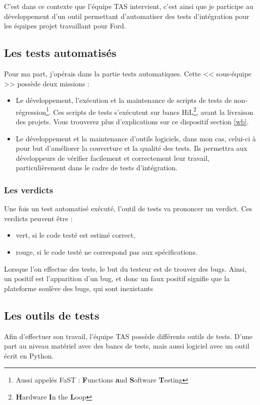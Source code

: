 C'est dans ce contexte que l'équipe TAS intervient, c'est ainsi que je participe au développement d'un outil permettant d'automatiser des tests d'intégration pour les équipes projet travaillant pour Ford.
\subsection{Les tests automatisés}

Pour ma part, j'opérais dans la partie tests automatiques. Cette << sous-équipe >> possède deux missions : 
\begin{itemize}
	\item Le développement, l'exécution et la maintenance de scripts de tests de non-régression\footnote{Aussi appelés FaST : \textbf{F}unctions \textbf{a}nd \textbf{S}oftware \textbf{T}esting}. Ces scripts de tests s'exécutent sur bancs HiL\footnote{\textbf{H}ardware \textbf{I}n the \textbf{L}oop}, avant la livraison des projets. Vous trouverez plus d'explications sur ce dispositif section \ref{wb}. 
	\item Le développement et la maintenance d'outils logiciels, dans mon cas, celui-ci à pour but d'améliorer la couverture et la qualité des tests. Ils permettra aux développeurs de vérifier facilement et correctement leur travail, particulièrement dans le cadre de tests d'intégration.
\end{itemize}

\subsubsection{Les verdicts}
Une fois un test automatisé exécuté, l'outil de tests va prononcer un verdict. Ces verdicts peuvent être :
\begin{itemize}
	\item vert, si le code testé est estimé correct,
	\item rouge, si le code testé ne correspond pas aux spécifications.
\end{itemize}

Lorsque l'on effectue des tests, le but du testeur est de trouver des bugs. Ainsi, un positif est l'apparition d'un bug, et donc un faux positif signifie que la plateforme soulève des bugs, qui sont inexistants

\subsection{Les outils de tests}
Afin d'effectuer son travail, l'équipe TAS possède différents outils de tests. D'une part au niveau matériel avec des bancs de tests, mais aussi logiciel avec un outil écrit en Python.

